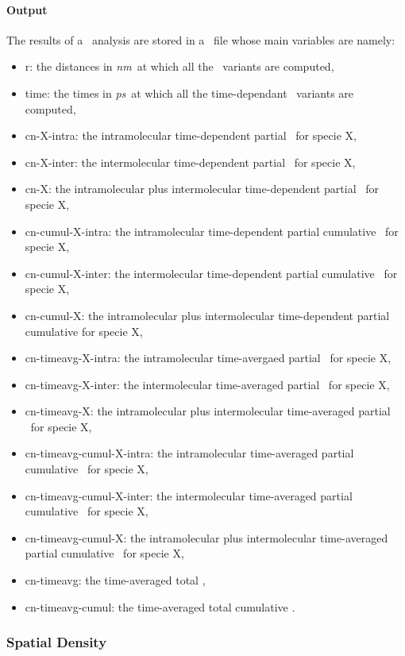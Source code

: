 \documentclass[a4paper,11pt]{report}
\newcommand{\nm}{\textit{nm}}
\newcommand{\ps}{\textit{ps}}
\begin{document}
\paragraph{Output\\}
The results of a \CN\ analysis are stored in a \NetCDF\ file whose main variables are namely:
\begin{itemize}
\item r: the distances in \nm\ at which all the \CN\ variants are computed,
\item time: the times in \ps\ at which all the time-dependant \CN\ variants are computed,
\item cn-X-intra: the intramolecular time-dependent partial \CN\ for specie X,
\item cn-X-inter: the intermolecular time-dependent partial \CN\ for specie X,
\item cn-X: the intramolecular plus intermolecular time-dependent partial \CN\ for specie X,
\item cn-cumul-X-intra: the intramolecular time-dependent partial cumulative \CN\ for specie X,
\item cn-cumul-X-inter: the intermolecular time-dependent partial cumulative \CN\ for specie X,
\item cn-cumul-X: the intramolecular plus intermolecular time-dependent partial cumulative \CN for specie X,
\item cn-timeavg-X-intra: the intramolecular time-avergaed partial \CN\ for specie X,
\item cn-timeavg-X-inter: the intermolecular time-averaged partial \CN\ for specie X,
\item cn-timeavg-X: the intramolecular plus intermolecular time-averaged partial \CN\ for specie X,
\item cn-timeavg-cumul-X-intra: the intramolecular time-averaged partial cumulative \CN\ for specie X,
\item cn-timeavg-cumul-X-inter: the intermolecular time-averaged partial cumulative \CN\ for specie X,
\item cn-timeavg-cumul-X: the intramolecular plus intermolecular time-averaged partial cumulative \CN\ for specie X,
\item cn-timeavg: the time-averaged total \CN ,
\item cn-timeavg-cumul: the time-averaged total cumulative \CN .
\end{itemize}

\subsubsection{Spatial Density}
\label{sd}
\end{document}
